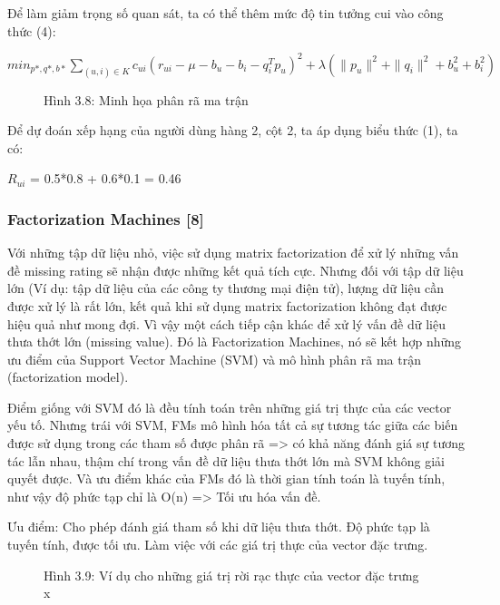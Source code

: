 \documentclass[a4paper,12pt,numbered,print,index,custombib, oneside, custommargin]{report}
\begin{document}
Để làm giảm trọng số quan sát, ta có thể thêm mức độ tin tưởng cui vào công thức (4):	 \par

$min_{p*, q*, b*}\sum_{(u,i)\in K} c_{ui}(r_{ui} - \mu - b_u - b_i - q_i^T p_u)^2 + \lambda(\parallel p_u \parallel^2 + \parallel q_i \parallel^2 + b_u^2 + b_i^2)$ \par

\begin{figure}[h]
\centering
\caption{Hình 3.8: Minh họa phân rã ma trận}
\end{figure}		\par

Để dự đoán xếp hạng của người dùng hàng 2, cột 2, ta áp dụng biểu thức (1), ta có: \par 
$R_{ui}$ = 0.5*0.8 + 0.6*0.1 = 0.46 \par

\subsubsection{Factorization Machines [8]}
Với những tập dữ liệu nhỏ, việc sử dụng matrix factorization để xử lý những vấn đề missing rating sẽ nhận được những kết quả tích cực. Nhưng đối với tập dữ liệu lớn (Ví dụ: tập dữ liệu của các công ty thương mại điện tử), lượng dữ liệu cần được xử lý là rất lớn, kết quả khi sử dụng matrix factorization không đạt được hiệu quả như mong đợi. Vì vậy một cách tiếp cận khác để xử lý vấn đề dữ liệu thưa thớt lớn (missing value). Đó là Factorization Machines, nó sẽ kết hợp những ưu điểm của Support Vector Machine (SVM) và mô hình phân rã ma trận (factorization model). \par
Điểm giống với SVM đó là đều tính toán trên những giá trị thực của các vector yếu tố. Nhưng trái với SVM, FMs mô hình hóa tất cả sự tương tác giữa các biến được sử dụng trong các tham số được phân rã => có khả năng đánh giá sự tương tác lẫn nhau, thậm chí trong vấn đề dữ liệu thưa thớt lớn mà SVM không giải quyết được. Và ưu điểm khác của FMs đó là thời gian tính toán là tuyến tính, như vậy độ phức tạp chỉ là O(n) => Tối ưu hóa vấn đề. \par
Ưu điểm:  Cho phép đánh giá tham số khi dữ liệu thưa thớt. Độ phức tạp là tuyến tính, được tối ưu. Làm việc với các giá trị thực của vector đặc trưng. \par

\begin{figure}[h]
\centering
\caption{Hình 3.9: Ví dụ cho những giá trị rời rạc thực của vector đặc trưng x}
\end{figure}		\par 
\end{document}
